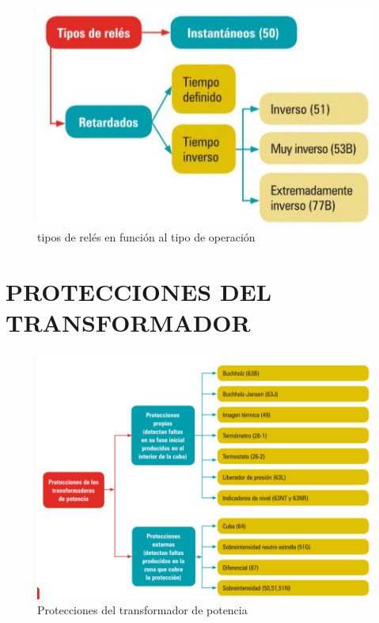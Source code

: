 \documentclass[a5paper]{book}%
\begin{document}
\begin{figure}[H]
	\centering
	
	\caption{tipos de relés en función al tipo de operación}
	\label{fig:tiporele}
	\includegraphics[width=\linewidth]{tipos_rele}
\end{figure}



\section{PROTECCIONES DEL TRANSFORMADOR}

\begin{figure}[H]
	\centering  
	\caption{Protecciones del transformador de potencia}
	\label{fig:proteccionestrafo}
	\includegraphics[width=\linewidth]{proteccion_trafo}
\end{figure}
\end{document}
